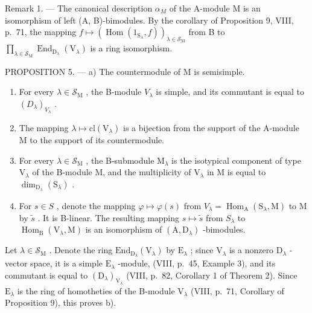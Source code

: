 Remark 1. --- The canonical description \(\alpha_{M}\) of the A-module M is an isomorphism of left (A, B)-bimodules. By the corollary of Proposition 9, VIII, p.~71, the mapping \(f \mapsto (\operatorname{Hom}(1_{\mathrm{S}_{\lambda}}, f))_{\lambda \in \mathcal{S}_{\mathrm{M}}}\) from B to \(\prod_{\lambda \in \mathcal{S}_{\mathrm{M}}} \operatorname{End}_{\mathrm{D}_{\lambda}}(\mathrm{V}_{\lambda})\) is a ring isomorphism.

PROPOSITION 5. --- a) The countermodule of M is semisimple.

\begin{enumerate}
\def\labelenumi{\alph{enumi})}
\setcounter{enumi}{1}
\item
  For every \(\lambda \in \mathcal{S}_{\mathrm{M}}\) , the B-module \(V_{\lambda}\) is simple, and its commutant is equal to \((D_{\lambda})_{V_{\lambda}}\) .
\item
  The mapping \(\lambda \mapsto \mathrm{cl}(\mathrm{V}_{\lambda})\) is a bijection from the support of the A-module M to the support of its countermodule.
\item
  For every \(\lambda \in \mathcal{S}_{\mathrm{M}}\) , the B-submodule \(\mathrm{M}_{\lambda}\) is the isotypical component of type \(\mathrm{V}_{\lambda}\) of the B-module M, and the multiplicity of \(\mathrm{V}_{\lambda}\) in M is equal to \(\dim_{\mathrm{D}_{\lambda}}(\mathrm{S}_{\lambda})\) .
\item
  For \(s \in S\) , denote the mapping \(\varphi \mapsto \varphi(s)\) from \(V_{\lambda} = \operatorname{Hom}_{\mathrm{A}}(\mathrm{S}_{\lambda}, \mathrm{M})\) to M by \(\widetilde{s}\) . It is B-linear. The resulting mapping \(s \mapsto \widetilde{s}\) from \(S_{\lambda}\) to \(\operatorname{Hom}_{\mathrm{B}}(\mathrm{V}_{\lambda}, \mathrm{M})\) is an isomorphism of \((\mathrm{A}, \mathrm{D}_{\lambda})\) -bimodules.
\end{enumerate}

Let \(\lambda \in \mathcal{S}_{\mathrm{M}}\) . Denote the ring \(\mathrm{End}_{\mathrm{D}_{\lambda}}(\mathrm{V}_{\lambda})\) by \(\mathrm{E}_{\lambda}\) ; since \(\mathrm{V}_{\lambda}\) is a nonzero \(\mathrm{D}_{\lambda}\) -vector space, it is a simple \(\mathrm{E}_{\lambda}\) -module, (VIII, p.~45, Example 3), and its commutant is equal to \((\mathrm{D}_{\lambda})_{\mathrm{V}_{\lambda}}\) (VIII, p.~82, Corollary 1 of Theorem 2). Since \(\mathrm{E}_{\lambda}\) is the ring of homotheties of the B-module \(\mathrm{V}_{\lambda}\) (VIII, p.~71, Corollary of Proposition 9), this proves b).

